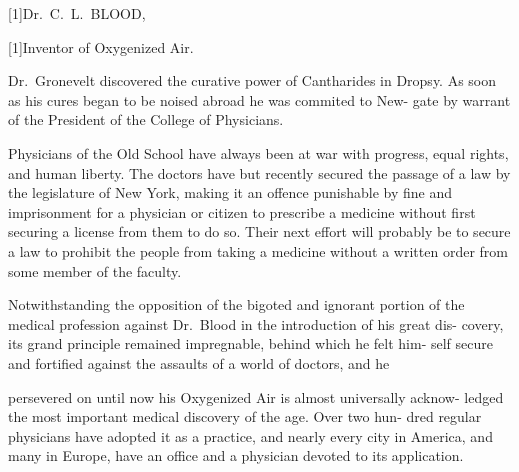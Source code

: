 \documentclass[10pt]{article}
\begin{document}
\begin{multicols}{3}
\begin{centering}
\Large\scalebox{1.1}[1]{Dr.~C.~L.~BLOOD,}

\vspace{2.5mm}

\large\scalebox{1.2}[1]{Inventor of Oxygenized Air.}

\end{centering}

\vspace{2.75mm}

Dr.~Gronevelt discovered the curative power of Cantharides in Dropsy.\linebreak
As soon as his cures began to be noised abroad he was commited to New-\linebreak
gate by warrant of the President of the College of Physicians.

Physicians of the Old School have always been at war with progress,\linebreak
equal rights, and human liberty. The doctors have but recently secured\linebreak
the passage of a law by the legislature of New York, making it an offence\linebreak
punishable by fine and imprisonment for a physician or citizen to prescribe\linebreak
a medicine without first securing a license from them to do so. Their next\linebreak
effort will probably be to secure a law to prohibit the people from taking a\linebreak
medicine without a written order from some member of the faculty.

Notwithstanding the opposition of the bigoted and ignorant portion of\linebreak
the medical profession against Dr.~Blood in the introduction of his great dis-\linebreak
covery, its grand principle remained impregnable, behind which he felt him-\linebreak
self secure and fortified against the assaults of a world of doctors, and he\linebreak

\vfill

\noindent persevered on until now his Oxygenized Air is almost universally acknow-\linebreak
ledged the most important medical discovery of the age. Over two hun-\linebreak
dred regular physicians have adopted it as a practice, and nearly every city\linebreak
in America, and many in Europe, have an office and a physician devoted\linebreak
to its application.


\end{multicols}
\end{document}
